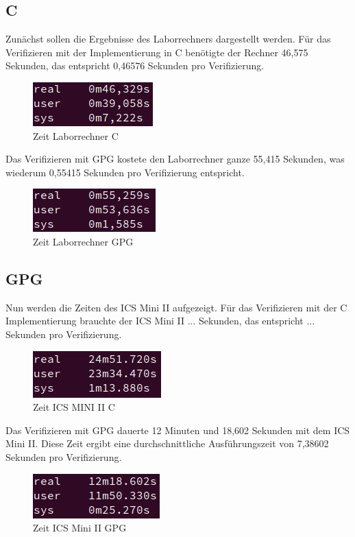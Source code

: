 \documentclass[thesis=bachelor,faculty=cb]{hsmw-thesis}
\begin{document}
{\subsection{C}
Zunächst sollen die Ergebnisse des Laborrechners dargestellt werden. Für das Verifizieren mit der Implementierung in C benötigte der Rechner 46,575 Sekunden, das entspricht 0,46576 Sekunden pro Verifizierung.
\begin{figure}[H]
	\centering
	\includegraphics[scale=0.8]{images/Laborrechner_C.PNG}
	\caption{Zeit Laborrechner C}
\end{figure}
\noindent
Das Verifizieren mit GPG kostete den Laborrechner ganze 55,415 Sekunden, was wiederum 0,55415 Sekunden pro Verifizierung entspricht.
\begin{figure}[H]
	\centering
	\includegraphics[scale=0.8]{images/Laborrechner_GPG.PNG}
	\caption{Zeit Laborrechner GPG}
\end{figure}
\subsection{GPG}
\noindent
Nun werden die Zeiten des ICS Mini II aufgezeigt. Für das Verifizieren mit der C Implementierung brauchte der ICS Mini II ... Sekunden, das entspricht ... Sekunden pro Verifizierung.
\begin{figure}[H]
	\centering
	\includegraphics[scale=0.8]{images/ICS_MINI_C_100.PNG}
	\caption{Zeit ICS MINI II C}
\end{figure}
Das Verifizieren mit GPG dauerte 12 Minuten und 18,602 Sekunden mit dem ICS Mini II. Diese Zeit ergibt eine durchschnittliche Ausführungszeit von 7,38602 Sekunden pro Verifizierung.
\begin{figure}[H]
	\centering
	\includegraphics[scale=0.8]{images/ICSMINIII_GPG.PNG}
	\caption{Zeit ICS Mini II GPG}
\end{figure}
\newpage
}
\end{document}
